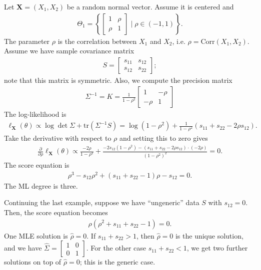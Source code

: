 \begin{eg}
  Let \( \mathbf X =(X_1, X_2) \) be a random normal vector. Assume it is centered and 
  \begin{align*}
    \Theta_1 = \left\{ \begin{bmatrix}1 & \rho \\ \rho & 1\end{bmatrix} \mid \rho \in (-1,1) \right\}.
  \end{align*}
  The parameter \( \rho \) is the correlation between \( X_1 \) and \( X_2 \), i.e. \( \rho = \mathrm{Corr}(X_1, X_2) \). Assume we have sample covariance matrix 
  \begin{align*}
    S = \begin{bmatrix}
      s_{11} & s_{12} \\ s_{12} & s_{22}
    \end{bmatrix};
  \end{align*}
  note that this matrix is symmetric. Also, we compute the precision matrix 
  \begin{align*}
    \Sigma^{-1} = K = \frac{1}{1 - \rho^2} \begin{bmatrix}
      1 & - \rho \\ -\rho & 1
    \end{bmatrix}
  \end{align*}
  The log-likelihood is 
  \begin{align*}
    \ell_{\mathbf X}(\theta) \propto \log \det \Sigma + \mathrm{tr}(\Sigma^{-1}S) = \log(1 - \rho^2) + \frac{1}{1 - \rho^2} (s_{11} + s_{22} -2 \rho s_{12}).
  \end{align*}
  Take the derivative with respect to \( \rho \) and setting this to zero gives
  \begin{align*}
    \frac{\partial}{\partial\rho}  \ell_{\mathbf X}(\theta) \propto \frac{-2\rho}{ 1 - \rho^2} + \frac{-2s_{12}(1 - \rho^2) - (s_{11} + s_{22} - 2\rho s_{12}) \cdot (-2 \rho)}{(1 - \rho^2)^2} = 0.
  \end{align*}
  The score equation is 
  \begin{align*}
    \rho^3 - s_{12}\rho^2 + (s_{11} + s_{22} - 1)\rho - s_{12} = 0.
  \end{align*}
  The ML degree is three.
\end{eg}

\begin{eg}
  Continuing the last example, suppose we have ``ungeneric'' data \( S \) with \( s_{12} = 0 \). Then, the score equation becomes
  \begin{align*}
    \rho(\rho^2 + s_{11} + s_{22} - 1)= 0.
  \end{align*}
  One MLE solution is \( \hat \rho = 0 \). If \( s_{11} + s_{22} > 1 \), then \( \hat \rho = 0 \) is the unique solution, and we have \( \hat \Sigma = \begin{bmatrix}
    1 & 0 \\ 0 & 1
  \end{bmatrix} \). For the other case \( s_{11} + s_{22} < 1 \), we get two further solutions on top of \( \hat \rho = 0 \); this is the generic case.
\end{eg}

